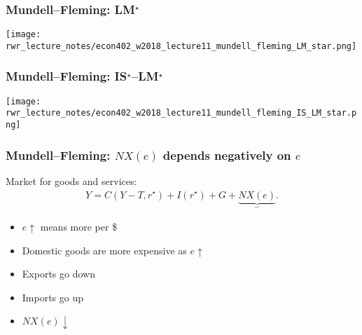 \documentclass[presentation,dvipsnames]{beamer}
\renewcommand{\pounds}{\text{\textsterling}{ }}
\begin{document}

\begin{frame}
\frametitle{Mundell--Fleming: LM$^{\star}$}
\centering
\texttt{[image: rwr\_lecture\_notes/econ402\_w2018\_lecture11\_mundell\_fleming\_LM\_star.png]}
\end{frame}

\begin{frame}
\frametitle{Mundell--Fleming: IS$^{\star}$--LM$^{\star}$}
\centering
\texttt{[image: rwr\_lecture\_notes/econ402\_w2018\_lecture11\_mundell\_fleming\_IS\_LM\_star.png]}
\end{frame}




\begin{frame}
\frametitle{Mundell--Fleming: $NX(e)$ depends negatively on $e$}
Market for goods and services:
\begin{align*}
Y = C(Y-T, r^{\star})  + I(r^{\star}) + G + \underbrace{NX(e)}_{-}.
\end{align*}
\begin{itemize}[label={--}]
\item $e \uparrow$ means more \pounds per \$
\item Domestic goods are more expensive as $e \uparrow$
\item Exports go down
\item Imports go up
\item $NX(e) \downarrow$
\end{itemize}
\end{frame}
\end{document}
